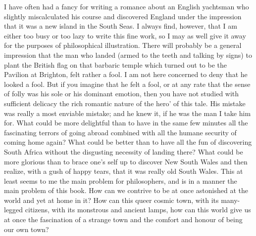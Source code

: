 \documentclass{book}
\begin{document}
I have often had a fancy for writing a romance about an English yachtsman who slightly miscalculated his course and discovered England under the impression that it was a new island in the South Seas. I always find, however, that I am either too busy or too lazy to write this fine work, so I may as well give it away for the purposes of philosophical illustration. There will probably be a general impression that the man who landed (armed to the teeth and talking by signs) to plant the British flag on that barbaric temple which turned out to be the Pavilion at Brighton, felt rather a fool. I am not here concerned to deny that he looked a fool. But if you imagine that he felt a fool, or at any rate that the sense of folly was his sole or his dominant emotion, then you have not studied with sufficient delicacy the rich romantic nature of the hero’ of this tale. His mistake was really a most enviable mistake; and he knew it, if he was the man I take him for. What could be more delightful than to have in the same few minutes all the fascinating terrors of going abroad combined with all the humane security of coming home again? What could be better than to have all the fun of discovering South Africa without the disgusting necessity of landing there? What could be more glorious than to brace one’s self up to discover New South Wales and then realize, with a gush of happy tears, that it was really old South Wales. This at least seems to me the main problem for philosophers, and is in a manner the main problem of this book. How can we contrive to be at once astonished at the world and yet at home in it? How can this queer cosmic town, with its many-legged citizens, with its monstrous and ancient lamps, how can this world give us at once the fascination of a strange town and the comfort and honour of being our own town?
\end{document}
